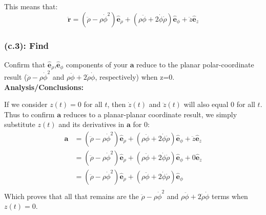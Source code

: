 \documentclass[titlepage]{article}
\begin{document}
\begin{mdframed}[linewidth=1pt, innertopmargin=10pt, innerbottommargin=10pt]
	This means that:
	\begin{equation}
		\ddot{\boldsymbol{r}}=\left(\ddot{\rho}-\rho\dot{\phi}^2\right)\hat{\boldsymbol{e}}_{\rho}+\left(\rho\ddot{\phi}+2\dot{\phi}\dot{\rho}\right)\hat{\boldsymbol{e}}_{\phi}+\ddot{z}\hat{\boldsymbol{e}}_z
	\end{equation}
\end{mdframed}

\subsubsection*{(c.3): Find}
Confirm that $\hat{\boldsymbol{e}}_{\rho}$,$\hat{\boldsymbol{e}}_{\phi}$ components of your $\boldsymbol{a}$ reduce to the planar polar-coordinate result ($\ddot{\rho}-\rho\dot{\phi}^2$ and $\rho\ddot{\phi}+2\dot{\rho}\dot{\phi}$, respectively) when z=0.\\

\textbf{Analysis/Conclusions:}
\begin{mdframed}[linewidth=1pt, innertopmargin=10pt, innerbottommargin=10pt]
	If we consider $z(t)=0$ for all $t$, then $\dot{z}(t)$ and $\ddot{z}(t)$ will also equal $0$ for all $t$. Thus to confirm $\boldsymbol{a}$ reduces to a planar-planar coordinate result, we simply substitute $z(t)$ and its derivatives in $\boldsymbol{a}$ for $0$:
	\begin{equation}
		\begin{split}
			\boldsymbol{a}&=\left(\ddot{\rho}-\rho\dot{\phi}^2\right)\hat{\boldsymbol{e}}_{\rho}+\left(\rho\ddot{\phi}+2\dot{\phi}\dot{\rho}\right)\hat{\boldsymbol{e}}_{\phi}+\ddot{z}\hat{\boldsymbol{e}}_z\\
			&=\left(\ddot{\rho}-\rho\dot{\phi}^2\right)\hat{\boldsymbol{e}}_{\rho}+\left(\rho\ddot{\phi}+2\dot{\phi}\dot{\rho}\right)\hat{\boldsymbol{e}}_{\phi}+0\hat{\boldsymbol{e}}_z\\
			&=\left(\ddot{\rho}-\rho\dot{\phi}^2\right)\hat{\boldsymbol{e}}_{\rho}+\left(\rho\ddot{\phi}+2\dot{\phi}\dot{\rho}\right)\hat{\boldsymbol{e}}_{\phi}\\
		\end{split}
	\end{equation}
	Which proves that all that remains are the $\ddot{\rho}-\rho\dot{\phi}^2$ and $\rho\ddot{\phi}+2\dot{\rho}\dot{\phi}$ terms when $z(t)=0$. 
\end{mdframed}

\newpage
\end{document}

